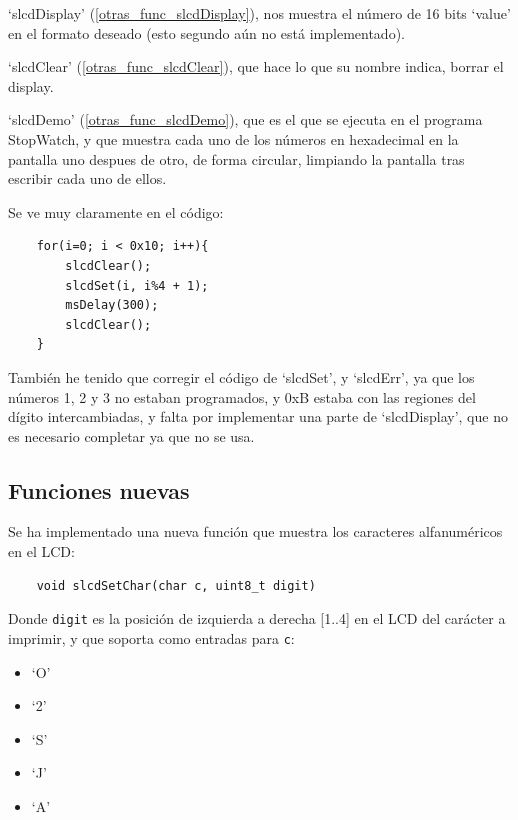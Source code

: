 \documentclass[a4paper,openright,12pt]{article}
\begin{document}
`slcdDisplay' (\ref{otras_func_slcdDisplay}), nos muestra el número de 16 bits `value' en el formato deseado (esto segundo aún no está implementado).

`slcdClear' (\ref{otras_func_slcdClear}), que hace lo que su nombre indica, borrar el display.

`slcdDemo' (\ref{otras_func_slcdDemo}), que es el que se ejecuta en el programa StopWatch, y que muestra cada uno de los números en hexadecimal en la pantalla uno
despues de otro, de forma circular, limpiando la pantalla tras escribir cada uno de ellos.

Se ve muy claramente en el código:
\begin{samepage}
\begin{verbatim}
    for(i=0; i < 0x10; i++){
        slcdClear();
        slcdSet(i, i%4 + 1);
        msDelay(300);
        slcdClear();
    }   
\end{verbatim}
\end{samepage}

También he tenido que corregir el código de `slcdSet', y `slcdErr', ya que los números 1, 2 y 3 no estaban programados,
y 0xB estaba con las regiones del dígito intercambiadas, y falta por implementar una parte de `slcdDisplay', que no es necesario completar ya que no se usa.

\subsection{Funciones nuevas}
Se ha implementado una nueva función que muestra los caracteres alfanuméricos en el LCD:
\begin{verbatim}
    void slcdSetChar(char c, uint8_t digit)
\end{verbatim}

Donde \texttt{digit} es la posición de izquierda a derecha [1..4] en el LCD del carácter a imprimir, y que soporta como entradas para \texttt{c}:
\begin{itemize}
    \item `O'
    \item `2'
    \item `S'
    \item `J'
    \item `A'
\end{itemize}


\clearpage
\printbibliography[]{}
\end{document}

